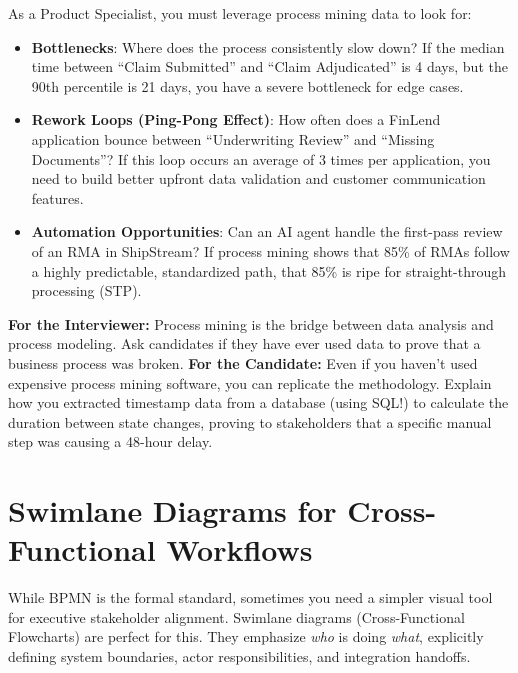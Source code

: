 \documentclass[
  11pt,
  openany,
  oneside]{book}
\providecommand{\tightlist}{%
  \setlength{\itemsep}{0pt}\setlength{\parskip}{0pt}}
\renewenvironment{quote}{\begin{customquote}}{\end{customquote}}
\begin{document}
As a Product Specialist, you must leverage process mining data to look
for:

\begin{itemize}
\tightlist
\item
  \textbf{Bottlenecks}: Where does the process consistently slow down?
  If the median time between ``Claim Submitted'' and ``Claim
  Adjudicated'' is 4 days, but the 90th percentile is 21 days, you have
  a severe bottleneck for edge cases.
\item
  \textbf{Rework Loops (Ping-Pong Effect)}: How often does a FinLend
  application bounce between ``Underwriting Review'' and ``Missing
  Documents''? If this loop occurs an average of 3 times per
  application, you need to build better upfront data validation and
  customer communication features.
\item
  \textbf{Automation Opportunities}: Can an AI agent handle the
  first-pass review of an RMA in ShipStream? If process mining shows
  that 85\% of RMAs follow a highly predictable, standardized path, that
  85\% is ripe for straight-through processing (STP).
\end{itemize}

\begin{quote}
\textbf{For the Interviewer:} Process mining is the bridge between data
analysis and process modeling. Ask candidates if they have ever used
data to prove that a business process was broken. \textbf{For the
Candidate:} Even if you haven't used expensive process mining software,
you can replicate the methodology. Explain how you extracted timestamp
data from a database (using SQL!) to calculate the duration between
state changes, proving to stakeholders that a specific manual step was
causing a 48-hour delay.
\end{quote}

\bigskip

\section{Swimlane Diagrams for Cross-Functional
Workflows}\label{swimlane-diagrams-for-cross-functional-workflows}

While BPMN is the formal standard, sometimes you need a simpler visual
tool for executive stakeholder alignment. Swimlane diagrams
(Cross-Functional Flowcharts) are perfect for this. They emphasize
\emph{who} is doing \emph{what}, explicitly defining system boundaries,
actor responsibilities, and integration handoffs.
\end{document}
